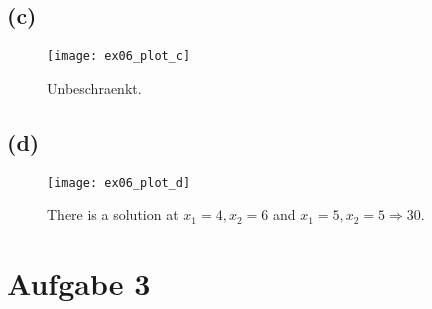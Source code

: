 \documentclass[a4paper]{scrartcl}
\begin{document}
\subsection*{(c)}
\begin{figure}[H]
	\texttt{[image: ex06\_plot\_c]}
	\caption{Unbeschraenkt.}
\end{figure}



\subsection*{(d)}
\begin{figure}[H]
	\texttt{[image: ex06\_plot\_d]}
	\caption{There is a solution at $x_1 = 4, x_2 = 6$ and $x_1 = 5, x_2 = 5 \Rightarrow 30$.}
\end{figure}








\section*{Aufgabe 3}
\end{document}
